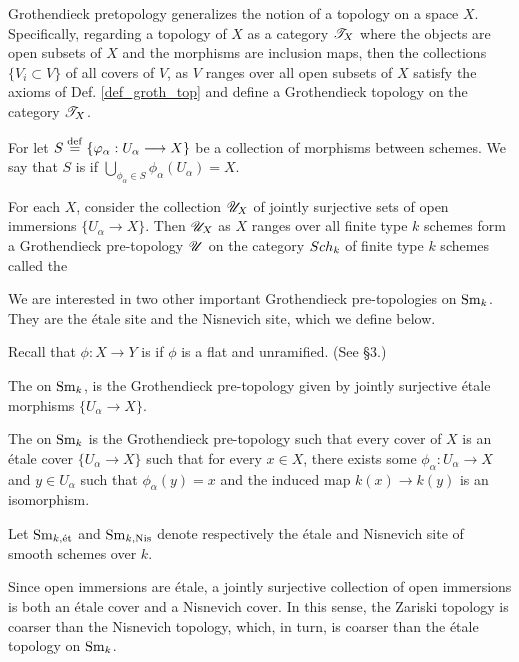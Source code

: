 \begin{rmk}
Grothendieck pretopology generalizes the notion of a topology on
a space $X$. Specifically, regarding a topology of $X$ as a 
category $\mathscr{T}_X$ where the objects are open subsets of $X$ and 
the morphisms are inclusion maps, then the collections $\{V_i 
\subset V\}$ of all covers of $V$, as $V$ ranges over all open 
subsets of $X$ satisfy the axioms of Def. \ref{def_groth_top} and 
define a Grothendieck topology on the category $\mathscr{T}_X$.
\end{rmk}

\begin{defn}
For let $S \stackrel{\mathrm{def}}{=} \{\varphi_\alpha: U_\alpha \longrightarrow X\}$ be a collection 
of morphisms between schemes. We say that $S$ is  if $\bigcup_{\phi_\alpha \in S} \phi_\alpha(U_\alpha)
= X$.
\end{defn}

\begin{rmk}
For each $X$, consider the collection $\mathscr{U}_X$ of jointly 
surjective sets of open immersions $\{U_\alpha \to X\}$. Then
$\mathscr{U}_X$ as $X$ ranges over all finite type $k$ schemes 
form a Grothendieck pre-topology $\mathscr{U}$ on the category 
$Sch_k$ of finite type $k$ schemes called the 
\end{rmk}

We are interested in two other important Grothendieck 
pre-topologies on $\mathrm{Sm}_{k}$. They are the \'etale site and the 
Nisnevich site, which we define below.

\begin{defn}
Recall that $\phi: X \to Y$ is  if $\phi$ is a flat
and unramified. (See \cite{Milne} \S 3.)

The  on $\mathrm{Sm}_{k}$, is the Grothendieck 
pre-topology given by jointly surjective \'etale morphisms 
$\{U_\alpha \to X\}.$

The  on $\mathrm{Sm}_{k}$ is the Grothendieck 
pre-topology such that every cover of $X$ is an \'etale cover 
$\{U_\alpha \to X\}$ such that for every $x \in X$, there exists 
some $\phi_\alpha: U_\alpha \to X$ and $y \in U_\alpha$ such that 
$\phi_\alpha(y) = x$ and the induced map $k(x) \to k(y)$ is an 
isomorphism.

Let $\mathrm{Sm}_{k,\mathrm{\acute{e}t}}$ and $\mathrm{Sm}_{k, \mathrm{Nis}}$ denote respectively the \'etale 
and Nisnevich site of smooth schemes over $k$.
\end{defn}

\begin{rmk}\label{rmk_comp_of_tops}
Since open immersions are \'etale, a jointly surjective collection 
of open immersions is both an \'etale cover and a Nisnevich cover. 
In this sense, the Zariski topology is coarser than the Nisnevich 
topology, which, in turn, is coarser than the \'etale topology
on $\mathrm{Sm}_{k}$.
\end{rmk}

